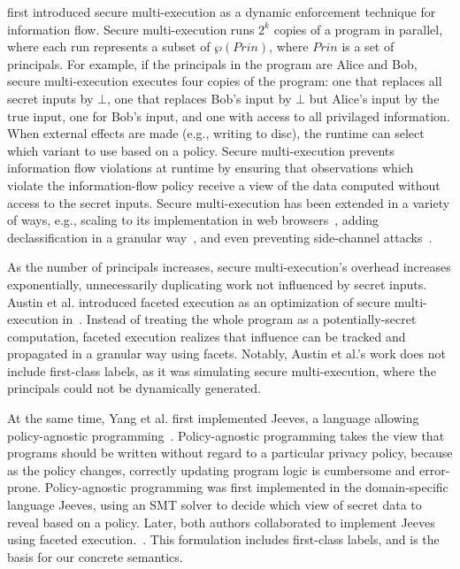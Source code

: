 \documentclass[review=true,acmlarge]{acmart}
\newcommand{\var}[1]{\mathit{#1}}
\begin{document}
\citet{Devriese:10} first introduced secure multi-execution as a
dynamic enforcement technique for information flow. Secure
multi-execution runs $2^k$ copies of a program in parallel, where each
run represents a subset of $\wp(\var{Prin})$, where $\var{Prin}$ is a
set of principals. For example, if the principals in the program are
Alice and Bob, secure multi-execution executes four copies of the
program: one that replaces all secret inputs by $\bot$, one that
replaces Bob's input by $\bot$ but Alice's input by the true input,
one for Bob's input, and one with access to all privilaged
information. When external effects are made (e.g., writing to disc),
the runtime can select which variant to use based on a policy. Secure
multi-execution prevents information flow violations at runtime by
ensuring that observations which violate the information-flow policy
receive a view of the data computed without access to the secret
inputs. Secure multi-execution has been extended in a variety of ways,
e.g., scaling to its implementation in web browsers~\cite{Bielova:11},
adding declassification in a granular way~\cite{Rafnsson:13}, and even
preventing side-channel attacks~\cite{Kashyap:11}.

As the number of principals increases, secure multi-execution's
overhead increases exponentially, unnecessarily duplicating work not
influenced by secret inputs. Austin et al. introduced faceted
execution as an optimization of secure multi-execution
in~\cite{Austin:2012}. Instead of treating the whole program as a
potentially-secret computation, faceted execution realizes that
influence can be tracked and propagated in a granular way using
facets. Notably, Austin et al.'s work does not include first-class
labels, as it was simulating secure multi-execution, where the
principals could not be dynamically generated.

At the same time, Yang et al. first implemented Jeeves, a language
allowing policy-agnostic programming~\cite{Yang:2012}. Policy-agnostic
programming takes the view that programs should be written without
regard to a particular privacy policy, because as the policy changes,
correctly updating program logic is cumbersome and
error-prone. Policy-agnostic programming was first implemented in the
domain-specific language Jeeves, using an SMT solver to decide which
view of secret data to reveal based on a policy. Later, both authors
collaborated to implement Jeeves using faceted
execution.~\cite{Austin:2013}. This formulation includes first-class
labels, and is the basis for our concrete semantics.
\end{document}
